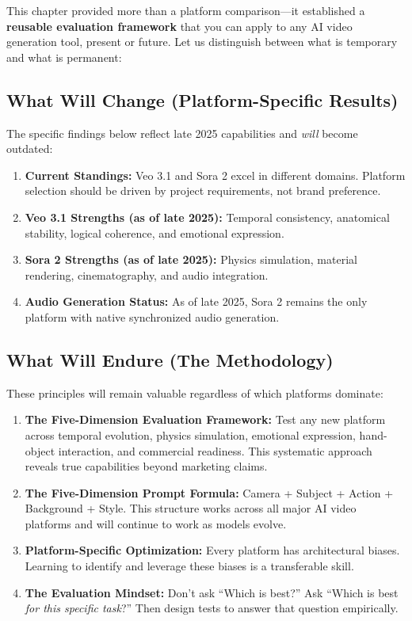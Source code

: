 This chapter provided more than a platform comparison---it established a \textbf{reusable evaluation framework} that you can apply to any AI video generation tool, present or future. Let us distinguish between what is temporary and what is permanent:

\subsection*{What Will Change (Platform-Specific Results)}

The specific findings below reflect late 2025 capabilities and \textit{will} become outdated:

\begin{enumerate}
    \item \textbf{Current Standings:} Veo 3.1 and Sora 2 excel in different domains. Platform selection should be driven by project requirements, not brand preference.

    \item \textbf{Veo 3.1 Strengths (as of late 2025):} Temporal consistency, anatomical stability, logical coherence, and emotional expression.

    \item \textbf{Sora 2 Strengths (as of late 2025):} Physics simulation, material rendering, cinematography, and audio integration.

    \item \textbf{Audio Generation Status:} As of late 2025, Sora 2 remains the only platform with native synchronized audio generation.
\end{enumerate}

\subsection*{What Will Endure (The Methodology)}

These principles will remain valuable regardless of which platforms dominate:

\begin{enumerate}
    \item \textbf{The Five-Dimension Evaluation Framework:} Test any new platform across temporal evolution, physics simulation, emotional expression, hand-object interaction, and commercial readiness. This systematic approach reveals true capabilities beyond marketing claims.

    \item \textbf{The Five-Dimension Prompt Formula:} Camera + Subject + Action + Background + Style. This structure works across all major AI video platforms and will continue to work as models evolve.

    \item \textbf{Platform-Specific Optimization:} Every platform has architectural biases. Learning to identify and leverage these biases is a transferable skill.

    \item \textbf{The Evaluation Mindset:} Don't ask ``Which is best?'' Ask ``Which is best \textit{for this specific task}?'' Then design tests to answer that question empirically.
\end{enumerate}

